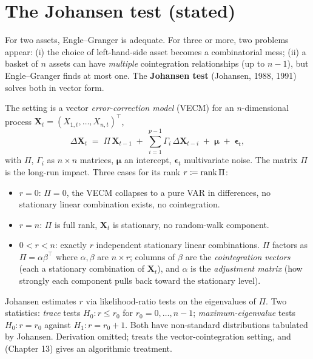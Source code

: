 \section{The Johansen test (stated)}
\label{sec:ch10_johansen}

For two assets, Engle--Granger is adequate. For three or more,
two problems appear: (i) the choice of left-hand-side asset
becomes a combinatorial mess; (ii) a basket of $n$ assets can have
\emph{multiple} cointegration relationships (up to $n-1$), but
Engle--Granger finds at most one. The \textbf{Johansen test}
(Johansen, 1988, 1991) solves both in vector form.

The setting is a vector \emph{error-correction model} (VECM) for an
$n$-dimensional process $\bm X_t = (X_{1,t}, \ldots, X_{n,t})^\top$,
\begin{equation}
  \Delta \bm X_t \;=\; \Pi\,\bm X_{t-1}
                       \;+\; \sum_{i=1}^{p-1}\Gamma_i\,\Delta\bm X_{t-i}
                       \;+\; \bm\mu \;+\; \bm\epsilon_t,
  \label{eq:vecm}
\end{equation}
with $\Pi$, $\Gamma_i$ as $n\times n$ matrices, $\bm\mu$ an
intercept, $\bm\epsilon_t$ multivariate noise. The matrix $\Pi$
is the long-run impact. Three cases for its rank
$r \coloneqq \operatorname{rank}\Pi$:
\begin{itemize}
  \item $r = 0$: $\Pi = 0$, the VECM collapses to a pure VAR in
  differences, no stationary linear combination exists, no
  cointegration.
  \item $r = n$: $\Pi$ is full rank, $\bm X_t$ is stationary, no
  random-walk component.
  \item $0 < r < n$: exactly $r$ independent stationary linear
  combinations. $\Pi$ factors as $\Pi = \alpha \beta^\top$ where
  $\alpha, \beta$ are $n \times r$; columns of $\beta$ are the
  \emph{cointegration vectors} (each a stationary combination of
  $\bm X_t$), and $\alpha$ is the \emph{adjustment matrix} (how
  strongly each component pulls back toward the stationary level).
\end{itemize}
Johansen estimates $r$ via likelihood-ratio tests on the
eigenvalues of $\Pi$. Two statistics: \emph{trace} tests
$H_0: r \leq r_0$ for $r_0 = 0, \ldots, n-1$;
\emph{maximum-eigenvalue} tests $H_0: r = r_0$ against
$H_1: r = r_0 + 1$. Both have non-standard distributions tabulated
by Johansen. Derivation omitted; \citeHasbrouck{} treats the
vector-cointegration setting, and \citeCartea{} (Chapter 13) gives
an algorithmic treatment.

